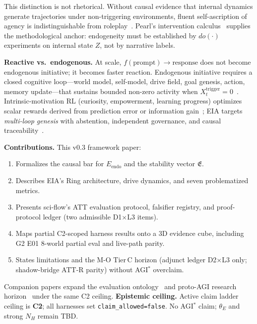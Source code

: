 \documentclass[11pt,a4paper]{article}
\theoremstyle{definition}
\begin{document}
This distinction is not rhetorical. Without causal evidence that internal dynamics generate trajectories under non-triggering environments, fluent self-ascription of agency is indistinguishable from roleplay~\cite{kuznetsov2026causal,veitch2021counterfactual}. Pearl's intervention calculus~\cite{pearl2009causality} supplies the methodological anchor: endogeneity must be established by $do(\cdot)$ experiments on internal state $Z$, not by narrative labels.

\textbf{Reactive vs.\ endogenous.} At scale, $f(\text{prompt})\to\text{response}$ does not become endogenous initiative; it becomes faster reaction. Endogenous initiative requires a closed cognitive loop---world model, self-model, drive field, goal genesis, action, memory update---that sustains bounded non-zero activity when $X_t^{\mathrm{trigger}}=0$~\cite{kuznetsov2026stable,schmidhuber2010curiosity}. Intrinsic-motivation RL (curiosity, empowerment, learning progress) optimizes scalar rewards derived from prediction error or information gain~\cite{pathak2017curiosity,mohamed2015empowerment,burda2019large}; EIA targets \emph{multi-loop genesis} with abstention, independent governance, and causal traceability~\cite{kuznetsov2026eia}.

\textbf{Contributions.} This v0.3 framework paper:
\begin{enumerate}[leftmargin=*]
\item Formalizes the causal bar for $E_{\mathrm{endo}}$ and the stability vector $\mathfrak{E}$.
\item Describes EIA's Ring architecture, drive dynamics, and seven problematized metrics.
\item Presents sci-flow's ATT evaluation protocol, falsifier registry, and proof-protocol ledger (two admissible D1$\times$L3 items).
\item Maps partial C2-scoped harness results onto a 3D evidence cube, including G2 E01 8-world partial eval and live-path parity.
\item States limitations and the M-O Tier\,C horizon (adjunct ledger D2$\times$L3 only; shadow-bridge ATT-R parity) without AGI$^{*}$ overclaim.
\end{enumerate}
Companion papers expand the evaluation ontology~\cite{kuznetsov2026cube3d} and proto-AGI research horizon~\cite{kuznetsov2026protohorizon} under the same C2 ceiling.
\textbf{Epistemic ceiling.} Active claim ladder ceiling is \textbf{C2}; all harnesses set \texttt{claim\_allowed=false}. No AGI$^{*}$ claim; $\theta_E$ and strong $N_H$ remain TBD.
\end{document}
